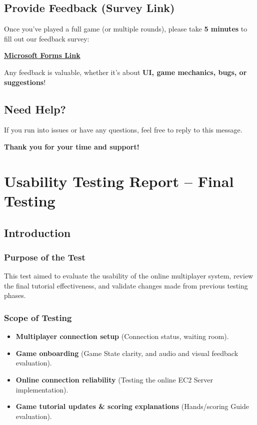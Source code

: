 \documentclass[12pt, titlepage]{article}
\begin{document}
\subsection{Provide Feedback (Survey Link)}

Once you’ve played a full game (or multiple rounds), please take \textbf{5 minutes} to fill out our feedback survey:

\href{https://forms.office.com/r/gp8yrLXu9v}{\textbf{Microsoft Forms Link}}

Any feedback is valuable, whether it's about \textbf{UI, game mechanics, bugs, or suggestions}!

\subsection{Need Help?}
If you run into issues or have any questions, feel free to reply to this message.

\bigskip

\begin{center}
\textbf{Thank you for your time and support!}
\end{center}


\section{Usability Testing Report – Final Testing}

\subsection{Introduction}

\subsubsection{Purpose of the Test}
This test aimed to evaluate the usability of the online multiplayer system, review the final tutorial effectiveness, and validate changes made from previous testing phases.

\subsubsection{Scope of Testing}
\begin{itemize}
    \item \textbf{Multiplayer connection setup} (Connection status, waiting room).
    \item \textbf{Game onboarding} (Game State clarity, and audio and visual feedback evaluation).
    \item \textbf{Online connection reliability} (Testing the online EC2 Server implementation).
    \item \textbf{Game tutorial updates \& scoring explanations} (Hands/scoring Guide evaluation).
\end{itemize}
\end{document}
